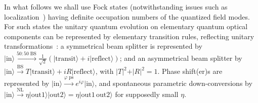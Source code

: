 \documentclass[%
  twocolumn,
 showpacs,
 showkeys,
 preprintnumbers,
 amsmath,amssymb,
 aps,
  pra,
  longbibliography,
 floatfix,
 ]{revtex4-1}
\begin{document}
In what follows we shall use Fock states (notwithstanding issues such as localization~\cite[p.~931]{mandel-PhysRevA.28.929})
having definite occupation numbers of the quantized field modes.
For such states the unitary quantum evolution on elementary quantum optical components
can be represented by elementary transition rules, reflecting unitary transformations~\cite{zeilinger:882,green-horn-zei}:
a symmetrical beam splitter is represented by
$
\vert \text{in} \rangle
\xrightarrow{50:50\; \text{BS}}
\frac{1}{\sqrt{2}}\left(
\vert \text{transit} \rangle
+ i
\vert \text{reflect} \rangle
\right)
$; and an asymmetrical beam splitter by
$
\vert \text{in} \rangle
\xrightarrow{\text{BS}}
T
\vert \text{transit} \rangle
+ i
R
\vert \text{reflect} \rangle
$, with
$\vert T \vert^2
+
\vert R \vert^2 =1$.
Phase shift(er)s are represented by
$
\vert \text{in} \rangle
\xrightarrow{\varphi \;\text{ps}}
e^{i\varphi}
\vert \text{in} \rangle
$,
and  spontaneous parametric down-conversions by
$
\vert \text{in} \rangle
\xrightarrow{\text{NL}}
\eta \vert \text{out}1 \rangle \vert  \text{out}2 \rangle
=
\eta \vert \text{out}1\, \text{out}2 \rangle
$  for supposedly small $\eta$.
\end{document}
